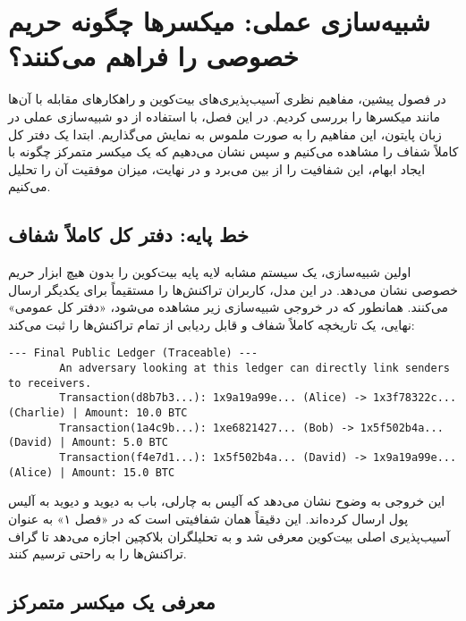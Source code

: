 \chapter{شبیه‌سازی عملی: میکسرها چگونه حریم خصوصی را فراهم می‌کنند؟}
\label{chap:mixer_simulation}

در فصول پیشین، مفاهیم نظری آسیب‌پذیری‌های بیت‌کوین و راهکارهای مقابله با آن‌ها مانند میکسرها را بررسی کردیم. در این فصل، با استفاده از دو شبیه‌سازی عملی در زبان پایتون، این مفاهیم را به صورت ملموس به نمایش می‌گذاریم. ابتدا یک دفتر کل کاملاً شفاف را مشاهده می‌کنیم و سپس نشان می‌دهیم که یک میکسر متمرکز چگونه با ایجاد ابهام، این شفافیت را از بین می‌برد و در نهایت، میزان موفقیت آن را تحلیل می‌کنیم.

\section{خط پایه: دفتر کل کاملاً شفاف}

اولین شبیه‌سازی، یک سیستم مشابه لایه پایه بیت‌کوین را بدون هیچ ابزار حریم خصوصی نشان می‌دهد. در این مدل، کاربران تراکنش‌ها را مستقیماً برای یکدیگر ارسال می‌کنند. همانطور که در خروجی شبیه‌سازی زیر مشاهده می‌شود، «دفتر کل عمومی» نهایی، یک تاریخچه کاملاً شفاف و قابل ردیابی از تمام تراکنش‌ها را ثبت می‌کند:

\begin{latin}
	\begin{lstlisting}[caption={خروجی شبیه‌سازی بدون میکسر}, label=list:no_mixer_output]
		--- Final Public Ledger (Traceable) ---
		An adversary looking at this ledger can directly link senders to receivers.
		Transaction(d8b7b3...): 1x9a19a99e... (Alice) -> 1x3f78322c... (Charlie) | Amount: 10.0 BTC
		Transaction(1a4c9b...): 1xe6821427... (Bob) -> 1x5f502b4a... (David) | Amount: 5.0 BTC
		Transaction(f4e7d1...): 1x5f502b4a... (David) -> 1x9a19a99e... (Alice) | Amount: 15.0 BTC
	\end{lstlisting}
\end{latin}

این خروجی به وضوح نشان می‌دهد که آلیس به چارلی، باب به دیوید و دیوید به آلیس پول ارسال کرده‌اند. این دقیقاً همان شفافیتی است که در «فصل ۱» به عنوان آسیب‌پذیری اصلی بیت‌کوین معرفی شد و به تحلیلگران بلاکچین اجازه می‌دهد تا گراف تراکنش‌ها را به راحتی ترسیم کنند.

\section{معرفی یک میکسر متمرکز}

